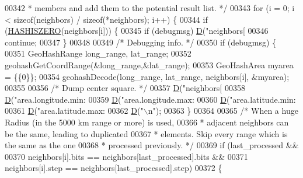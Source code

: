 \begin{DoxyCode}
{{00342 \textcolor{comment}{     * members and add them to the potential result list. */}
00343     \textcolor{keywordflow}{for} (i = 0; i < \textcolor{keyword}{sizeof}(neighbors) / \textcolor{keyword}{sizeof}(*neighbors); i++) \{
00344         \textcolor{keywordflow}{if} (\hyperlink{geohash_8h_a097b8152f901ce8d8537f70b7108d9d4}{HASHISZERO}(neighbors[i])) \{
00345             \textcolor{keywordflow}{if} (debugmsg) \hyperlink{debugmacro_8h_a74021f021dcdfbb22891787b79c5529d}{D}(\textcolor{stringliteral}{"neighbors[%
00346             \textcolor{keywordflow}{continue};
00347         \}
00348 
00349         \textcolor{comment}{/* Debugging info. */}
00350         \textcolor{keywordflow}{if} (debugmsg) \{
00351             GeoHashRange long\_range, lat\_range;
00352             geohashGetCoordRange(&long\_range,&lat\_range);
00353             GeoHashArea myarea = \{\{0\}\};
00354             geohashDecode(long\_range, lat\_range, neighbors[i], &myarea);
00355 
00356             \textcolor{comment}{/* Dump center square. */}
00357             \hyperlink{debugmacro_8h_a74021f021dcdfbb22891787b79c5529d}{D}(\textcolor{stringliteral}{"neighbors[%
00358             \hyperlink{debugmacro_8h_a74021f021dcdfbb22891787b79c5529d}{D}(\textcolor{stringliteral}{"area.longitude.min: %
00359             \hyperlink{debugmacro_8h_a74021f021dcdfbb22891787b79c5529d}{D}(\textcolor{stringliteral}{"area.longitude.max: %
00360             \hyperlink{debugmacro_8h_a74021f021dcdfbb22891787b79c5529d}{D}(\textcolor{stringliteral}{"area.latitude.min: %
00361             \hyperlink{debugmacro_8h_a74021f021dcdfbb22891787b79c5529d}{D}(\textcolor{stringliteral}{"area.latitude.max: %
00362             \hyperlink{debugmacro_8h_a74021f021dcdfbb22891787b79c5529d}{D}(\textcolor{stringliteral}{"\(\backslash\)n"});
00363         \}
00364 
00365         \textcolor{comment}{/* When a huge Radius (in the 5000 km range or more) is used,}
00366 \textcolor{comment}{         * adjacent neighbors can be the same, leading to duplicated}
00367 \textcolor{comment}{         * elements. Skip every range which is the same as the one}
00368 \textcolor{comment}{         * processed previously. */}
00369         \textcolor{keywordflow}{if} (last\_processed &&
00370             neighbors[i].bits == neighbors[last\_processed].bits &&
00371             neighbors[i].step == neighbors[last\_processed].step)
00372         \{
}}}}}}}}
\end{DoxyCode}
